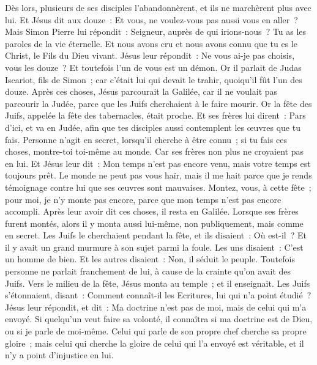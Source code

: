 \begin{multicols}{2}
Dès lors, plusieurs de ses disciples l'abandonnèrent, et ils ne marchèrent plus avec lui.
Et Jésus dit aux douze~: Et vous, ne voulez-vous pas aussi vous en aller~?
Mais Simon Pierre lui répondit~: Seigneur, auprès de qui irions-nous~? Tu as les paroles de la vie éternelle.
Et nous avons cru et nous avons connu que tu es le Christ, le Fils du Dieu vivant.
Jésus leur répondit~: Ne vous ai-je pas choisis, vous les douze~? Et toutefois l'un de vous est un démon.
Or il parlait de Judas Iscariot, fils de Simon~; car c'était lui qui devait le trahir, quoiqu'il fût l'un des douze.
\VerseOne{}Après ces choses, Jésus parcourait la Galilée, car il ne voulait pas parcourir la Judée, parce que les Juifs cherchaient à le faire mourir.
Or la fête des Juifs, appelée la fête des tabernacles, était proche.
Et ses frères lui dirent~: Pars d'ici, et va en Judée, afin que tes disciples aussi contemplent les œuvres que tu fais.
Personne n'agit en secret, lorsqu'il cherche à être connu~; si tu fais ces choses, montre-toi toi-même au monde.
Car ses frères non plus ne croyaient pas en lui.
Et Jésus leur dit~: Mon temps n'est pas encore venu, mais votre temps est toujours prêt.
Le monde ne peut pas vous haïr, mais il me hait parce que je rends témoignage contre lui que ses œuvres sont mauvaises.
Montez, vous, à cette fête~; pour moi, je n'y monte pas encore, parce que mon temps n'est pas encore accompli.
Après leur avoir dit ces choses, il resta en Galilée.
Lorsque ses frères furent montés, alors il y monta aussi lui-même, non publiquement, mais comme en secret.
Les Juifs le cherchaient pendant la fête, et ils disaient~: Où est-il~?
Et il y avait un grand murmure à son sujet parmi la foule. Les uns disaient~: C'est un homme de bien. Et les autres disaient~: Non, il séduit le peuple.
Toutefois personne ne parlait franchement de lui, à cause de la crainte qu'on avait des Juifs.
Vers le milieu de la fête, Jésus monta au temple~; et il enseignait.
Les Juifs s'étonnaient, disant~: Comment connaît-il les Ecritures, lui qui n'a point étudié~?
Jésus leur répondit, et dit~: Ma doctrine n'est pas de moi, mais de celui qui m'a envoyé.
Si quelqu'un veut faire sa volonté, il connaîtra si ma doctrine est de Dieu, ou si je parle de moi-même.
Celui qui parle de son propre chef cherche sa propre gloire~; mais celui qui cherche la gloire de celui qui l'a envoyé est véritable, et il n'y a point d'injustice en lui.

\end{multicols}
